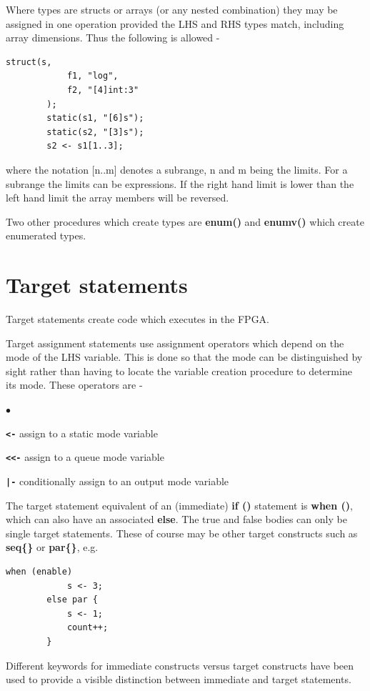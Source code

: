 \documentclass[10pt,a4paper,twoside,fleqn]{article}
\newcommand{\blist}{\begin{list}{$\bullet$}{\setlength{\itemsep}{-5pt}\setlength{\topsep}{-5pt}}}
\newcommand{\blend}{\end{list}}
\newcommand{\kwd}[1]{{\bf #1}} %
\begin{document}
    Where types are structs or arrays (or any nested combination) they
    may be assigned in one operation provided the LHS and RHS types match,
    including array dimensions. Thus the following is allowed -
    \begin{lstlisting}[language=threepl]
        struct(s,
            f1, "log",
            f2, "[4]int:3"
        );
        static(s1, "[6]s");
        static(s2, "[3]s");
        s2 <- s1[1..3];
    \end{lstlisting}
    where the notation [n..m] denotes a subrange, n and m being the limits.
    For a subrange the limits can be expressions. If the right hand limit
    is lower than the left hand limit the array members will be reversed.
    
    Two other procedures which create types are \kwd{enum()} and \kwd{enumv()}
    which create enumerated types.


\section{Target statements}

    Target statements create code which executes in the FPGA.
    
    Target assignment statements use assignment operators which depend on the
    mode of the LHS variable. This is done so that the mode can be distinguished
    by sight rather than having to locate the variable creation procedure to
    determine its mode. These operators are -

    \blist
    \item   {\bf \verb'<-'} assign to a static mode variable
    \item   {\bf \verb'<<-'} assign to a queue mode variable
    \item   {\bf \verb'|-'} conditionally assign to an output mode variable
    \blend
    
    The target statement equivalent of an (immediate) {\bf if ()} statement
    is {\bf when ()}, which can also have an associated {\bf else}. The true and
    false bodies can only be single target statements. These of course may
    be other target constructs such as {\bf seq\{\}} or {\bf par\{\}}, e.g.
    \begin{lstlisting}[language=threepl]
        when (enable)
            s <- 3;
        else par {
            s <- 1;
            count++;
        }
    \end{lstlisting}
    Different keywords for immediate constructs versus target constructs have
    been used to provide a visible distinction between immediate and target
    statements.
       
\end{document}
